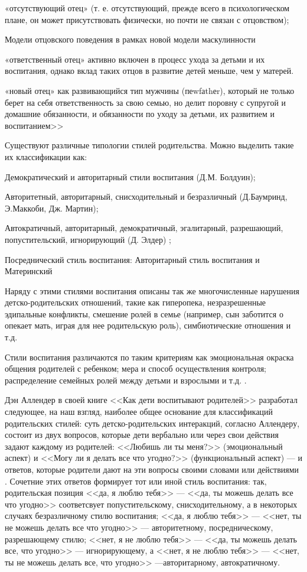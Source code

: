 \documentclass{../../common/thesisbyxetex}
\begin{document}
«отсутствующий отец» (т. е. отсутствующий, прежде всего в психологическом плане, он может
присутствовать физически, но почти не связан с отцовством);

Модели отцовского поведения в рамках новой модели маскулинности

«ответственный отец» активно включен в процесс ухода за детьми и их воспитания, однако вклад таких
отцов в развитие детей меньше, чем у матерей.

«новый отец» как развивающийся тип мужчины (пеwfаthеr), который не только берет на себя
ответственность за свою семью, но делит поровну с супругой и домашние обязанности, и обязанности по
уходу за детьми, их развитием и воспитанием>> \cite{clec}



Существуют различные типологии стилей родительства. Можно выделить такие их классификации как:

Демократический и авторитарный стили воспитания (Д.М. Болдуин);

Авторитетный, авторитарный, снисходительный и безразличный (Д.Баумринд, Э.Маккоби, Дж. Мартин);

Автократичный, авторитарный, демократичный, эгалитарный, разрешающий, попустительский, игнорирующий
(Д. Элдер) \cite{stil};

Посреднический стиль воспитания: Авторитарный стиль воспитания и Материнский \cite[281]{strat}

Наряду с этими стилями воспитания описаны так же многочисленные нарушения детско-родительских
отношений, такие как гиперопека,  незразрешенные эдипальные конфликты, смешение ролей в семье
(например, сын заботится о опекает мать, играя для нее родительскую роль), симбиотические отношения
и т.д.


Стили воспитания различаются по таким критериям как эмоциональная окраска общения родителей с
ребенком; мера и способ осуществления контроля; распределение семейных ролей между детьми и
взрослыми и т.д. \cite{stil}.

Дэн Аллендер в своей книге <<Как дети воспитывают родителей>> разработал следующее, на наш взгляд,
наиболее общее основание для классификаций родительских стилей: суть детско-родительских
интеракций, согласно Аллендеру, состоит из двух вопросов, которые дети вербально или
через свои действия задают каждому из родителей: <<Любишь ли ты меня?>> (эмоциональный аспект) и
<<Могу ли я делать все что угодно?>> (функциональный аспект) --- и ответов, которые родители
дают на эти вопросы своими словами или действиями \cite{den}. Сочетние этих ответов формирует тот
или иной стиль воспитания: так, родительская позиция <<да, я люблю тебя>> --- <<да, ты можешь делать
все что угодно>> соответсвует попустительскому, снисходительному, а в некоторых случаях
безразличному стилю воспитания; <<да, я люблю тебя>>  --- <<нет, ты не можешь делать все что
угодно>> --- авторитетному, посредническому, разрешающему стилю; <<нет, я не люблю тебя>> --- <<да,
ты можешь делать все, что угодно>>  --- игнорирующему, а  <<нет, я не люблю тебя>> --- <<нет, ты не
можешь делать все, что угодно>> ---авторитарному, автократичному.
\end{document}
